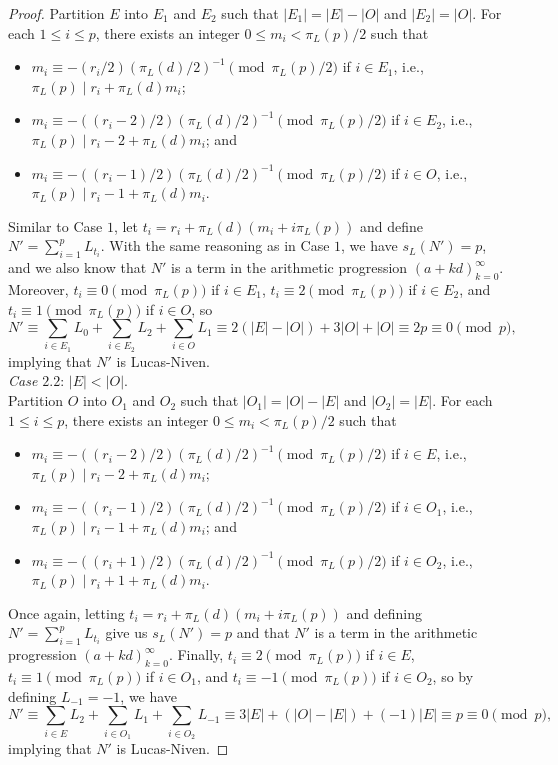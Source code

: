 \documentclass[10pt,a4paper]{amsart}
\begin{document}
\begin{proof}
Partition $E$ into $E_1$ and $E_2$ such that $|E_1|=|E|-|O|$ and $|E_2|=|O|$. For each $1\leq i\leq p$, there exists an integer $0\leq m_i<\pi_L(p)/2$ such that
\begin{itemize}
\item $m_i\equiv-(r_i/2)(\pi_L(d)/2)^{-1}\pmod{\pi_L(p)/2}$ if $i\in E_1$, i.e., $\pi_L(p)\mid r_i+\pi_L(d)m_i$;
\item $m_i\equiv-((r_i-2)/2)(\pi_L(d)/2)^{-1}\pmod{\pi_L(p)/2}$ if $i\in E_2$, i.e., $\pi_L(p)\mid r_i-2+\pi_L(d)m_i$; and
\item $m_i\equiv-((r_i-1)/2)(\pi_L(d)/2)^{-1}\pmod{\pi_L(p)/2}$ if $i\in O$, i.e., $\pi_L(p)\mid r_i-1+\pi_L(d)m_i$.
\end{itemize}
Similar to Case $1$, let $t_i=r_i+\pi_L(d)(m_i+i\pi_L(p))$ and define $N'=\sum_{i=1}^pL_{t_i}$. With the same reasoning as in Case $1$, we have $s_L(N')=p$, and we also know that $N'$ is a term in the arithmetic progression $(a+kd)_{k=0}^\infty$. Moreover, $t_i\equiv0\pmod{\pi_L(p)}$ if $i\in E_1$, $t_i\equiv2\pmod{\pi_L(p)}$ if $i\in E_2$, and $t_i\equiv1\pmod{\pi_L(p)}$ if $i\in O$, so
\[N'\equiv\sum_{i\in E_1}L_0+\sum_{i\in E_2}L_2+\sum_{i\in O}L_1\equiv2(|E|-|O|)+3|O|+|O|\equiv2p\equiv0\pmod{p},\]
implying that $N'$ is Lucas-Niven.\\

\noindent\textit{Case $2.2$}: $|E|<|O|$.\\

Partition $O$ into $O_1$ and $O_2$ such that $|O_1|=|O|-|E|$ and $|O_2|=|E|$. For each $1\leq i\leq p$, there exists an integer $0\leq m_i<\pi_L(p)/2$ such that
\begin{itemize}
\item $m_i\equiv-((r_i-2)/2)(\pi_L(d)/2)^{-1}\pmod{\pi_L(p)/2}$ if $i\in E$, i.e., $\pi_L(p)\mid r_i-2+\pi_L(d)m_i$;
\item $m_i\equiv-((r_i-1)/2)(\pi_L(d)/2)^{-1}\pmod{\pi_L(p)/2}$ if $i\in O_1$, i.e., $\pi_L(p)\mid r_i-1+\pi_L(d)m_i$; and
\item $m_i\equiv-((r_i+1)/2)(\pi_L(d)/2)^{-1}\pmod{\pi_L(p)/2}$ if $i\in O_2$, i.e., $\pi_L(p)\mid r_i+1+\pi_L(d)m_i$.
\end{itemize}
Once again, letting $t_i=r_i+\pi_L(d)(m_i+i\pi_L(p))$ and defining $N'=\sum_{i=1}^pL_{t_i}$ give us $s_L(N')=p$ and that $N'$ is a term in the arithmetic progression $(a+kd)_{k=0}^\infty$. Finally, $t_i\equiv2\pmod{\pi_L(p)}$ if $i\in E$, $t_i\equiv1\pmod{\pi_L(p)}$ if $i\in O_1$, and $t_i\equiv-1\pmod{\pi_L(p)}$ if $i\in O_2$, so by defining $L_{-1}=-1$, we have
\[N'\equiv\sum_{i\in E}L_2+\sum_{i\in O_1}L_1+\sum_{i\in O_2}L_{-1}\equiv3|E|+(|O|-|E|)+(-1)|E|\equiv p\equiv0\pmod{p},\]
implying that $N'$ is Lucas-Niven.
\end{proof}
\end{document}
